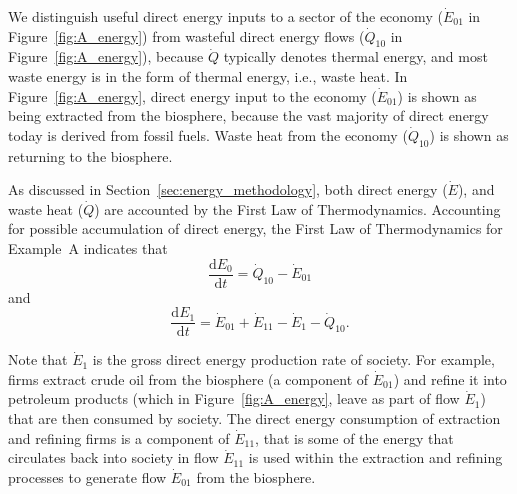We distinguish useful direct energy inputs to a sector of the economy
($\dot{E}_{01}$ in Figure~\ref{fig:A_energy}) from wasteful direct energy flows 
($\dot{Q}_{10}$ in Figure~\ref{fig:A_energy}), 
because $\dot{Q}$ typically denotes thermal energy, 
and most waste energy is in the form of thermal
energy, i.e., waste heat. In Figure~\ref{fig:A_energy}, direct energy input to the 
economy ($\dot{E}_{01}$) is shown as being extracted from the biosphere, because
the vast majority of direct energy today is derived from fossil fuels.
Waste heat from the economy ($\dot{Q}_{10}$) is shown as returning 
to the biosphere.

As discussed in Section~\ref{sec:energy_methodology}, 
both direct energy ($\dot{E}$), and waste heat ($\dot{Q}$) 
are accounted by the First Law of Thermodynamics. 
Accounting for possible accumulation of direct energy, 
the First Law of Thermodynamics for Example~A indicates that
%
\begin{equation} \label{eq:dE_0/dt_single_sector}
	\frac{\mathrm{d}E_0}{\mathrm{d}t} 
	= \dot{Q}_{10} 
	- \dot{E}_{01}
\end{equation}
%
and
%
\begin{equation} \label{eq:dE_1/dt_single_sector}
	\frac{\mathrm{d}E_{1}}{\mathrm{d}t} 
	= \dot{E}_{01} 
	+ \dot{E}_{11}
	- \dot{E}_{1}
	- \dot{Q}_{10}.
\end{equation}

Note that $\dot{E}_{1}$ is the gross direct energy production rate
of society. 
For example, firms extract crude oil from the biosphere (a component of $\dot{E}_{01}$) 
and refine it into petroleum products 
(which in Figure~\ref{fig:A_energy}, leave as part of flow $\dot{E}_{1}$)
that are then consumed by society.
The direct energy consumption of extraction and refining firms 
is a component of $\dot{E}_{11}$,
that is some of the energy that circulates back into society in flow $\dot{E}_{11}$
is used within the extraction and refining processes to generate flow
$\dot{E}_{01}$ from the biosphere.

